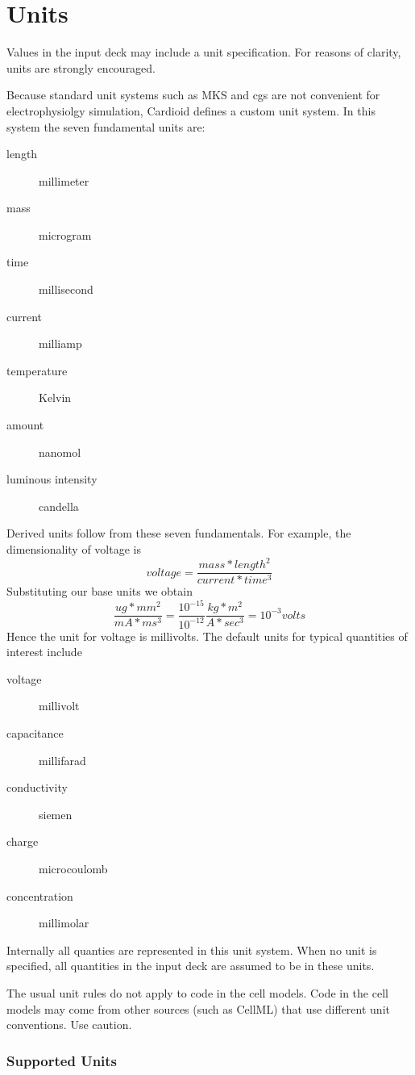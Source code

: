 \documentclass{article}
\begin{document}
\section{Units}

Values in the input deck may include a unit specification.  For reasons
of clarity, units are strongly encouraged.  

Because standard unit systems such as MKS and cgs are not convenient for
electrophysiolgy simulation, Cardioid defines a custom unit system.
In this system the seven fundamental units are:
\begin{description}
\item[length] millimeter
\item[mass]   microgram
\item[time] millisecond
\item[current] milliamp
\item[temperature] Kelvin
\item[amount] nanomol
\item[luminous intensity] candella
\end{description}
Derived units follow from these seven fundamentals.  For example, the
dimensionality of voltage is 
\[
voltage = \frac{mass * length^2}{current * time^3} 
\]
Substituting our base units we obtain
\[
\frac{ug*mm^2}{mA*ms^3} = \frac{10^{-15}}{10^{-12}}\frac{kg*m^2}{A*sec^3} =
10^{-3}volts
\]
Hence the unit for voltage is millivolts.  The default units for typical
quantities of interest include
\begin{description}
\item[voltage] millivolt
\item[capacitance] millifarad
\item[conductivity] siemen
\item[charge] microcoulomb
\item[concentration] millimolar
\end{description}
Internally all quanties are represented in this unit system.  When no
unit is specified, all quantities in the input deck are assumed to be in
these units.

The usual unit rules do not apply to code in the cell models.  Code in
the cell models may come from other sources (such as CellML) that use
different unit conventions.  Use caution.

\subsubsection{Supported Units}
\end{document}
